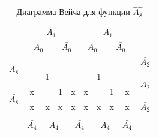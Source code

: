 \documentclass[a4paper,14pt]{article}
\begin{document}
\begin{table}[H]
\begin{minipage}{.5\linewidth}
		\centering
		\caption{Диаграмма Вейча для функции $\bar{\hat{A_8}}$}
\begin{tabular}{cccccccccc}
	& \multicolumn{4}{c}{$A_1$}                                                                         & \multicolumn{4}{c}{$\bar{A_1}$}                                                                   &                        \\
	& \multicolumn{2}{c}{$A_0$}                       & \multicolumn{2}{c}{$\bar{A_0}$}                 & \multicolumn{2}{c}{$A_0$}                       & \multicolumn{2}{c}{$\bar{A_0}$}                 &                        \\ \cline{2-9}
	\multicolumn{1}{c|}{\multirow{2}{*}{$A_8$}}       & \multicolumn{1}{c|}{}  & \multicolumn{1}{c|}{}  & \multicolumn{1}{c|}{}  & \multicolumn{1}{c|}{}  & \multicolumn{1}{c|}{}  & \multicolumn{1}{c|}{}  & \multicolumn{1}{c|}{}  & \multicolumn{1}{c|}{}  & $\bar{A_2}$            \\ \cline{2-9}
	\multicolumn{1}{c|}{}                             & \multicolumn{1}{c|}{}  & \multicolumn{1}{c|}{1} & \multicolumn{1}{c|}{}  & \multicolumn{1}{c|}{}  & \multicolumn{1}{c|}{}  & \multicolumn{1}{c|}{1} & \multicolumn{1}{c|}{}  & \multicolumn{1}{c|}{}  & \multirow{2}{*}{$A_2$} \\ \cline{2-9}
	\multicolumn{1}{c|}{\multirow{2}{*}{$\bar{A_8}$}} & \multicolumn{1}{c|}{x} & \multicolumn{1}{c|}{}  & \multicolumn{1}{c|}{1} & \multicolumn{1}{c|}{x} & \multicolumn{1}{c|}{x} & \multicolumn{1}{c|}{}  & \multicolumn{1}{c|}{1} & \multicolumn{1}{c|}{x} &                        \\ \cline{2-9}
	\multicolumn{1}{c|}{}                             & \multicolumn{1}{c|}{x} & \multicolumn{1}{c|}{x} & \multicolumn{1}{c|}{x} & \multicolumn{1}{c|}{x} & \multicolumn{1}{c|}{x} & \multicolumn{1}{c|}{x} & \multicolumn{1}{c|}{x} & \multicolumn{1}{c|}{x} & $\bar{A_2}$            \\ \cline{2-9}
	\\
	& $\bar{A_4}$            & \multicolumn{2}{c}{$A_4$}                       & \multicolumn{2}{c}{$\bar{A_4}$}                 & \multicolumn{2}{c}{$A_4$}                       & $\bar{A_4}$            &                       
\end{tabular}
	\end{minipage} 
\end{table}
\end{document}
